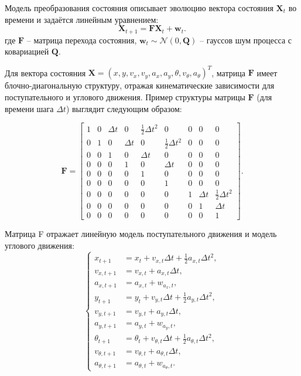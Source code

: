 Модель преобразования состояния описывает эволюцию вектора состояния \(\mathbf{X}_t\) во времени и задаётся линейным уравнением:
\[
\mathbf{X}_{t+1} = \mathbf{F} \mathbf{X}_t + \mathbf{w}_t.
\]
где \(\mathbf{F}\) -- матрица перехода состояния, 
\(\mathbf{w}_t \sim \mathcal{N}(0, \mathbf{Q})\) -- гауссов шум процесса с ковариацией \(\mathbf{Q}\).

Для вектора состояния \(\mathbf{X} = (x, y, v_x, v_y, a_x, a_y, \theta, v_\theta, a_\theta)^T\),
матрица \(\mathbf{F}\) имеет блочно-диагональную структуру,
отражая кинематические зависимости для поступательного и углового движения.
Пример структуры матрицы \(\mathbf{F}\) (для времени шага \(\Delta t\)) выглядит следующим образом:

\[
\mathbf{F} =
\begin{bmatrix}
1 & 0 & \Delta t & 0 & \frac{1}{2} \Delta t^2 & 0 & 0 & 0 & 0 \\
0 & 1 & 0 & \Delta t & 0 & \frac{1}{2} \Delta t^2 & 0 & 0 & 0 \\
0 & 0 & 1 & 0 & \Delta t & 0 & 0 & 0 & 0 \\
0 & 0 & 0 & 1 & 0 & \Delta t & 0 & 0 & 0 \\
0 & 0 & 0 & 0 & 1 & 0 & 0 & 0 & 0 \\
0 & 0 & 0 & 0 & 0 & 1 & 0 & 0 & 0 \\
0 & 0 & 0 & 0 & 0 & 0 & 1 & \Delta t & \frac{1}{2} \Delta t^2 \\
0 & 0 & 0 & 0 & 0 & 0 & 0 & 1 & \Delta t \\
0 & 0 & 0 & 0 & 0 & 0 & 0 & 0 & 1
\end{bmatrix}.
\]

Матрица F отражает линейную модель поступательного движения 
и модель углового движения:
\begin{equation}
\label{eq:state_transition_system}
\left\{
\begin{aligned}
x_{t+1} &= x_t + v_{x,t} \Delta t + \frac{1}{2} a_{x,t} \Delta t^2, \\
v_{x,t+1} &= v_{x,t} + a_{x,t} \Delta t, \\
a_{x,t+1} &= a_{x,t} + w_{a_x,t}, \\
y_{t+1} &= y_t + v_{y,t} \Delta t + \frac{1}{2} a_{y,t} \Delta t^2, \\
v_{y,t+1} &= v_{y,t} + a_{y,t} \Delta t, \\
a_{y,t+1} &= a_{y,t} + w_{a_y,t}, \\
\theta_{t+1} &= \theta_t + v_{\theta,t} \Delta t + \frac{1}{2} a_{\theta,t} \Delta t^2, \\
v_{\theta,t+1} &= v_{\theta,t} + a_{\theta,t} \Delta t, \\
a_{\theta,t+1} &= a_{\theta,t} + w_{a_\theta,t}.
\end{aligned}
\right.
\end{equation}

